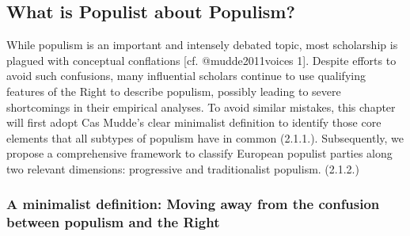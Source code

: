 \documentclass[]{article}
\title{}
\author{}
\date{}
\begin{document}
\subsection{What is Populist about
Populism?}\label{what-is-populist-about-populism}

While populism is an important and intensely debated topic, most
scholarship is plagued with conceptual conflations {[}cf.
@mudde2011voices 1{]}. Despite efforts to avoid such confusions, many
influential scholars continue to use qualifying features of the Right to
describe populism, possibly leading to severe shortcomings in their
empirical analyses. To avoid similar mistakes, this chapter will first
adopt Cas Mudde's clear minimalist definition to identify those core
elements that all subtypes of populism have in common (2.1.1.).
Subsequently, we propose a comprehensive framework to classify European
populist parties along two relevant dimensions: progressive and
traditionalist populism. (2.1.2.)

\subsubsection{A minimalist definition: Moving away from the confusion
between populism and the
Right}\label{a-minimalist-definition-moving-away-from-the-confusion-between-populism-and-the-right}
\end{document}

